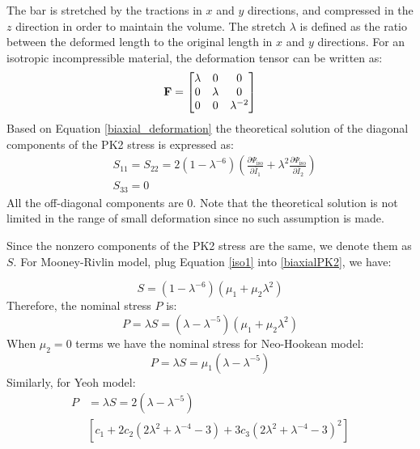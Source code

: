 The bar is stretched by the tractions in $x$ and $y$ directions, and compressed in the $z$ direction in order to maintain the volume. The stretch $\lambda$ is defined as the ratio between the deformed length to the original length in $x$ and $y$ directions. For an isotropic incompressible material, the deformation tensor can be written as:
\begin{equation} \label{biaxial_deformation}
\bold{F} =    \begin{bmatrix}
      \lambda & 0 & 0 \\
      0 & \lambda & 0 \\
      0 & 0 & \lambda^{-2}\\
\end{bmatrix}
\end{equation}
Based on Equation \ref{biaxial_deformation} the theoretical solution of the diagonal components of the PK2 stress is expressed as:
\begin{equation} \label{biaxialPK2}
\begin{split}
&S_{11} = S_{22} = 2(1 - {\lambda}^{-6})\left(\frac{\partial\Psi_\mathrm{iso}}{\partial\bar{I}_1} + {\lambda}^2\frac{\partial\Psi_\mathrm{iso}}{\partial\bar{I}_2}\right) \\ &S_{33} = 0
\end{split}
\end{equation}
All the off-diagonal components are $0$. Note that the theoretical solution is not limited in the range of small deformation since no such assumption is made.

Since the nonzero components of the PK2 stress are the same, we denote them as $S$. For Mooney-Rivlin model, plug Equation \ref{iso1} into \ref{biaxialPK2}, we have:

\begin{equation}
S = (1 - {\lambda}^{-6})(\mu_1 + \mu_2{\lambda}^2)
\end{equation}
Therefore, the nominal stress $P$ is:
\begin{equation}
P = \lambda S =  (\lambda - {\lambda}^{-5})(\mu_1 + \mu_2{\lambda}^2)
\end{equation}
When $\mu_2 = 0$ terms we have the nominal stress for Neo-Hookean model:
\begin{equation}
P = \lambda S =  \mu_1(\lambda - {\lambda}^{-5})
\end{equation}
Similarly, for Yeoh model:
\begin{equation}
\begin{split}
P &= \lambda S = 2(\lambda - {\lambda}^{-5}) \\ & \left[c_1 + 2c_2(2{\lambda}^2 + {\lambda}^{-4} - 3) + 3c_3(2{\lambda}^2 + {\lambda}^{-4} - 3)^2\right]
\end{split}
\end{equation}



